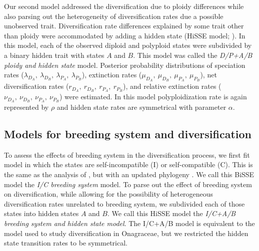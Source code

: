 Our second model addressed the diversification due to ploidy differences while also parsing out the heterogeneity of diversification rates due a possible unobserved trait.
Diversification rate differences explained by some trait other than ploidy were accommodated by adding a hidden state (HiSSE model; \citealt{beaulieu_2016}). %
In this model, each of the observed diploid and polyploid states were subdivided by a binary hidden trait with states $A$ and $B$.
This model was called the \textit{D/P+A/B ploidy and hidden state} model. 
Posterior probability distributions of speciation rates ($\lambda_{D_A},\ \lambda_{D_B},\ \lambda_{P_A},\ \lambda_{P_B}$), extinction rates ($\mu_{D_A},\ \mu_{D_B},\ \mu_{P_A},\ \mu_{P_B}$), net diversification rates ($r_{D_A},\ r_{D_B},\ r_{P_A},\ r_{P_B}$), and relative extinction rates ($\nu_{D_A},\ \nu_{D_B},\ \nu_{P_A},\ \nu_{P_B}$) were estimated.
In this model polyploidization rate  is again represented by $\rho$  and hidden state rates are symmetrical with parameter  $\alpha$. %

\subsection{Models for breeding system and diversification}

To assess the effects of breeding system in the diversification process, we first fit model in which the states are self-incompatible (I) or self-compatible (C).
This is the same as the analysis of \citet{goldberg_2010}, but with an updated phylogeny \citep{sarkinen_2013}.
We call this BiSSE model the \textit{I/C breeding system} model. 
To parse out the effect of breeding system on diversification, while allowing for the possibility of heterogeneous diversification rates unrelated to breeding system, we subdivided each of those states into hidden states $A$ and $B$.
We call this HiSSE model the \textit{I/C+A/B breeding system and hidden state model}.
The I/C+A/B model is equivalent to the model \citet{freyman_2017} used to study diversification in Onagraceae, but we restricted the hidden state transition rates to be symmetrical. 

